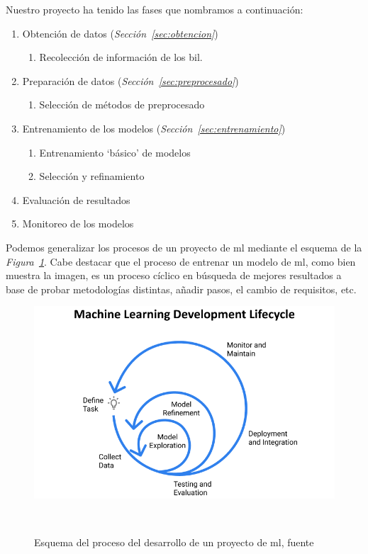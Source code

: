 Nuestro proyecto ha tenido las fases que nombramos a continuación:

\begin{enumerate}
    \item Obtención de datos (\textit{Sección\ \ref{sec:obtencion}})
        \begin{enumerate}
            \item Recolección de información de los \acrshort{bil}.
        \end{enumerate}
    \item Preparación de datos (\textit{Sección\ \ref{sec:preprocesado}})
        \begin{enumerate}
            \item Selección de métodos de preprocesado
        \end{enumerate}
    \item Entrenamiento de los modelos (\textit{Sección\ \ref{sec:entrenamiento}})
        \begin{enumerate}
            \item Entrenamiento `básico' de modelos
            \item Selección y refinamiento
        \end{enumerate}
    \item Evaluación de resultados
        
    \item Monitoreo de los modelos
\end{enumerate}

Podemos generalizar los procesos de un proyecto de \gls{ml} mediante el esquema de la \textit{Figura\ \ref{fig:ml-development-cycle}}. Cabe destacar que el proceso de entrenar un modelo de \gls{ml}, como bien muestra la imagen, es un proceso cíclico en búsqueda de mejores resultados a base de probar metodologías distintas, añadir pasos, el cambio de requisitos, etc.

\begin{figure}[!htb]
    \centering
    \includegraphics[width=\linewidth]{media/images/ml-development-cycle.png}
    \caption{Esquema del proceso del desarrollo de un proyecto de \gls{ml}, fuente\ \cite{Organizi22:online}}\ \label{fig:ml-development-cycle}
\end{figure}


